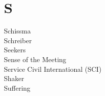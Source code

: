 \section*{S}

\articlesize

\begin{description}
 \item[Schissma]

 \item[Schreiber]

 \item[Seekers]

 \item[Sense of the Meeting]

 \item[Service Civil International (SCI)]

 \item[Shaker]

 \item[Suffering]

 \end{description}

\normalsize
